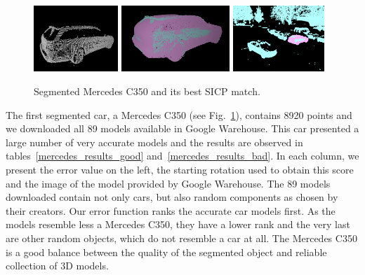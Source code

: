 \documentclass{llncs}
\begin{document}
\begin{figure}
  \centering
  \includegraphics[height=25mm]{chapter5_pictures/Mercedes}
  \hfill
  \includegraphics[height=25mm]{chapter5_pictures/Mercedes_matched}
  \hfill
  \includegraphics[height=25mm]{chapter5_pictures/Mercedes_matched_scan}
  \caption{Segmented Mercedes C350 and its best SICP match.}
  \label{mercedes_trio}
\end{figure}

The first segmented car, a Mercedes C350 (see
Fig.~\ref{mercedes_trio}), contains 8920 points and we downloaded all
89 models available in Google Warehouse. This car presented a large
number of very accurate models and the results are observed in
tables~\ref{mercedes_results_good} and~\ref{mercedes_results_bad}. In
each column, we present the error value on the left, the starting
rotation used to obtain this score and the image of the model provided
by Google Warehouse. The 89 models downloaded contain not only cars,
but also random components as chosen by their creators. Our error
function ranks the accurate car models first. As the models resemble
less a Mercedes C350, they have a lower rank and the very last are
other random objects, which do not resemble a car at all. The Mercedes
C350 is a good balance between the quality of the segmented object and
reliable collection of 3D models.
\end{document}
